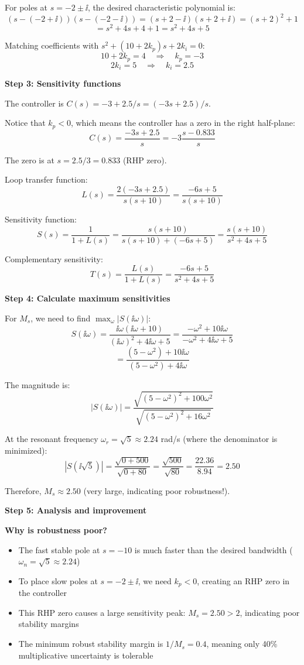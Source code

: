 \documentclass[11pt,a4paper]{article}
\begin{document}
For poles at $s = -2 \pm \ii$, the desired characteristic polynomial is:
\[
(s - (-2 + \ii))(s - (-2 - \ii)) = (s+2-\ii)(s+2+\ii) = (s+2)^2 + 1
\]
\[
= s^2 + 4s + 4 + 1 = s^2 + 4s + 5
\]

Matching coefficients with $s^2 + (10 + 2k_p)s + 2k_i = 0$:
\[
10 + 2k_p = 4 \quad \Rightarrow \quad k_p = -3
\]
\[
2k_i = 5 \quad \Rightarrow \quad k_i = 2.5
\]

\textbf{Step 3: Sensitivity functions}

The controller is $C(s) = -3 + 2.5/s = (-3s + 2.5)/s$.

Notice that $k_p < 0$, which means the controller has a zero in the right half-plane:
\[
C(s) = \frac{-3s + 2.5}{s} = -3\frac{s - 0.833}{s}
\]

The zero is at $s = 2.5/3 = 0.833$ (RHP zero).

Loop transfer function:
\[
L(s) = \frac{2(-3s + 2.5)}{s(s+10)} = \frac{-6s + 5}{s(s+10)}
\]

Sensitivity function:
\[
S(s) = \frac{1}{1 + L(s)} = \frac{s(s+10)}{s(s+10) + (-6s + 5)} = \frac{s(s+10)}{s^2 + 4s + 5}
\]

Complementary sensitivity:
\[
T(s) = \frac{L(s)}{1 + L(s)} = \frac{-6s + 5}{s^2 + 4s + 5}
\]

\textbf{Step 4: Calculate maximum sensitivities}

For $M_s$, we need to find $\max_\omega |S(\ii\omega)|$:
\[
S(\ii\omega) = \frac{\ii\omega(\ii\omega + 10)}{(\ii\omega)^2 + 4\ii\omega + 5} = \frac{-\omega^2 + 10\ii\omega}{-\omega^2 + 4\ii\omega + 5}
\]
\[
= \frac{(5-\omega^2) + 10\ii\omega}{(5-\omega^2) + 4\ii\omega}
\]

The magnitude is:
\[
|S(\ii\omega)| = \frac{\sqrt{(5-\omega^2)^2 + 100\omega^2}}{\sqrt{(5-\omega^2)^2 + 16\omega^2}}
\]

At the resonant frequency $\omega_r = \sqrt{5} \approx 2.24$ rad/s (where the denominator is minimized):
\[
|S(\ii\sqrt{5})| = \frac{\sqrt{0 + 500}}{\sqrt{0 + 80}} = \frac{\sqrt{500}}{\sqrt{80}} = \frac{22.36}{8.94} = 2.50
\]

Therefore, $M_s \approx 2.50$ (very large, indicating poor robustness!).

\textbf{Step 5: Analysis and improvement}

\textbf{Why is robustness poor?}
\begin{itemize}
\item The fast stable pole at $s = -10$ is much faster than the desired bandwidth ($\omega_n = \sqrt{5} \approx 2.24$)
\item To place slow poles at $s = -2 \pm \ii$, we need $k_p < 0$, creating an RHP zero in the controller
\item This RHP zero causes a large sensitivity peak: $M_s = 2.50 > 2$, indicating poor stability margins
\item The minimum robust stability margin is $1/M_s = 0.4$, meaning only 40\% multiplicative uncertainty is tolerable
\end{itemize}
\end{document}

